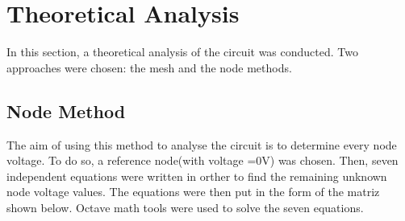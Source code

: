 

\section {Theoretical Analysis}
\label{analysis}

In this section, a theoretical analysis of the circuit was conducted. Two approaches were chosen: the mesh and the node methods.

\subsection{Node Method}

The aim of using this method to analyse the circuit is to determine every node voltage. To do so, a reference node(with voltage =0V) was chosen. Then, seven independent equations were written in orther to find the remaining unknown node voltage values. The equations were then put in the form of the matriz shown below. Octave math tools were used to solve the seven equations.\\
\

